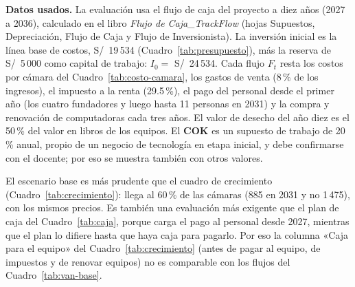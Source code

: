 \documentclass[12pt,a4paper]{article}
\begin{document}
\textbf{Datos usados.} La evaluación usa el flujo de caja del proyecto a diez
años (2027 a 2036), calculado en el libro \textit{Flujo de Caja\_TrackFlow}
(hojas Supuestos, Depreciación, Flujo de Caja y Flujo de Inversionista). La
inversión inicial es la línea base de costos, S/~19\,534
(Cuadro~\ref{tab:presupuesto}), más la reserva de S/~5\,000 como capital de
trabajo: $I_0 = $ S/~24\,534. Cada flujo $F_t$ resta los costos por cámara del
Cuadro~\ref{tab:costo-camara}, los gastos de venta (8\,\% de los ingresos), el
impuesto a la renta (29.5\,\%), el pago del personal desde el primer año (los
cuatro fundadores y luego hasta 11 personas en 2031) y la compra y renovación
de computadoras cada tres años. El valor de desecho del año diez es el 50\,\%
del valor en libros de los equipos. El \textbf{COK} es un supuesto de trabajo de
20\,\% anual, propio de un negocio de tecnología en etapa inicial, y debe
confirmarse con el docente; por eso se muestra también con otros valores.

El escenario base es más prudente que el cuadro de crecimiento
(Cuadro~\ref{tab:crecimiento}): llega al 60\,\% de las cámaras (885 en 2031 y
no 1\,475), con los mismos precios. Es también una evaluación más exigente que
el plan de caja del Cuadro~\ref{tab:caja}, porque carga el pago al personal
desde 2027, mientras que el plan lo difiere hasta que haya caja para pagarlo.
Por eso la columna «Caja para el equipo» del Cuadro~\ref{tab:crecimiento} (antes
de pagar al equipo, de impuestos y de renovar equipos) no es comparable con los
flujos del Cuadro~\ref{tab:van-base}.
\end{document}
